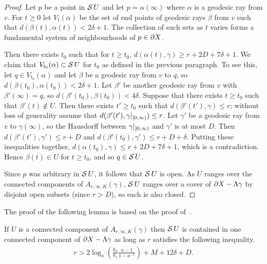 \begin{proof} Let $p$ be a point in $\operatorname{\mathcal{S}} U$ and let $p = \alpha(\infty)$
where $\alpha$ is a geodesic ray from $v$. For $t \geq 0$ let
$V_{t}(\alpha)$ be the set of end points of geodesic rays $\beta$ from $v$ such that
$d(\beta(t), \alpha(t)) < 2\delta + 1$. The collection of such sets as $t$
varies forms a fundamental system of neighbourhoods of $p \in \partial X$. 

Then there exists $t_0$ such that for $t \geq t_0$, $d(\alpha(t), \gamma) \geq
r + 2D + 7\delta + 1$.  We claim that $V_{t_0}(\alpha) \subset \operatorname{\mathcal{S}} U$
for $t_0$ as defined in the previous paragraph. To see this, let $q \in
V_{t_0}(\alpha)$ and let $\beta$ be a geodesic ray from $v$ to $q$, so
$d(\beta(t_0), \alpha(t_0)) < 2\delta+1$.  Let $\beta'$ be another geodesic ray
from $v$ with $\beta'(\infty) = q$, so $d(\beta'(t_0), \beta(t_0)) < 4\delta$.
Suppose that there exists $t \geq t_0$ such that $\beta'(t) \notin U$. Then
there exists $t' \geq t_0$ such that $d(\beta'(t'), \gamma) \leq r$; without
loss of generality assume that $d(\beta'(t'), \gamma\vert_{[0, \infty)})
\leq r$. Let $\gamma'$ be a geodesic ray from $v$ to $\gamma(\infty)$, so the
Hausdorff between $\gamma\vert_{[0, \infty)}$ and $\gamma'$ is at most
$D$. Then $d(\beta'(t'), \gamma') \leq r + D$ and $d(\beta'(t_0), \gamma')
\leq r + D + \delta$. Putting these inequalities together, $d(\alpha(t_0),
\gamma) \leq r + 2D + 7\delta + 1$, which is a contradiction. Hence
$\beta(t) \in U$ for $t \geq t_0$, and so $q \in \operatorname{\mathcal{S}} U$.

Since $p$ was arbitrary in $\operatorname{\mathcal{S}} U$, it follows that $\operatorname{\mathcal{S}} U$ is open. As
$U$ ranges over the connected components of $A_{r, \infty, K}(\gamma)$,
$\operatorname{\mathcal{S}} U$ ranges over a cover of $\partial X - \Lambda\gamma$ by disjoint
open subsets (since $r > D$), so each is also closed.\end{proof}

The proof of the following lemma is based on the proof 
of~\cite[Proposition 3.2]{bestvinamess91}.

\begin{lem}\label{lem:shadowsconnected} If $U$ is a connected component of 
$A_{r, \infty, K}(\gamma)$ then $\operatorname{\mathcal{S}} U$ is contained in one connected
component of $\partial X - \Lambda \gamma$ as long as $r$ satisfies the
following inequality.
\begin{align*}
  r > 2\log_a\left(\frac{k_2}{k_1}\frac{n-1}{1-a^{-1}}\right) + M + 12\delta + D.
\end{align*}
\end{lem}

